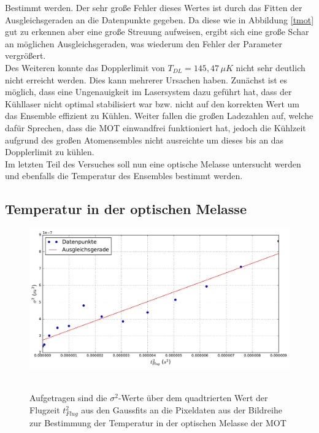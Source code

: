 \documentclass[twoside,colorback,accentcolor=tud4c,11pt]{tudreport}
\begin{document}
Bestimmt werden. Der sehr große Fehler dieses Wertes ist durch das Fitten der Ausgleichsgeraden an die Datenpunkte gegeben. Da diese wie in Abbildung \ref{tmot} gut zu erkennen aber eine große Streuung aufweisen, ergibt sich eine große Schar an möglichen Ausgleichsgeraden, was wiederum den Fehler der Parameter vergrößert.\\
Des Weiteren konnte das Dopplerlimit von $T_{DL}=145,47\,\si{\mu K}$ \cite{limit} nicht sehr deutlich nicht erreicht werden. Dies kann mehrerer Ursachen haben. Zunächst ist es möglich, dass eine Ungenauigkeit im Lasersystem dazu geführt hat, dass der Kühllaser nicht optimal stabilisiert war bzw. nicht auf den korrekten Wert um das Ensemble effizient zu Kühlen. Weiter fallen die großen Ladezahlen auf, welche dafür Sprechen, dass die MOT einwandfrei funktioniert hat, jedoch die Kühlzeit aufgrund des großen Atomensembles nicht ausreichte um dieses bis an das Dopplerlimit zu kühlen.\\
Im letzten Teil des Versuches soll nun eine optische Melasse untersucht werden und ebenfalls die Temperatur des Ensembles bestimmt werden.
\subsection{Temperatur in der optischen Melasse}
\begin{figure}[H]
\centering
   	\begin{minipage}[b]{0.85\textwidth}
   	\includegraphics[width=\textwidth]{graphics/tempmel.pdf}\
   	\end{minipage}
\caption{Aufgetragen sind die $\sigma^2$-Werte über dem quadtrierten Wert der Flugzeit $t_{Flug}^2$ aus den Gaussfits an die Pixeldaten aus der Bildreihe zur Bestimmung der Temperatur in der optischen Melasse der MOT}\label{tmel}	
\end{figure}
\end{document}
